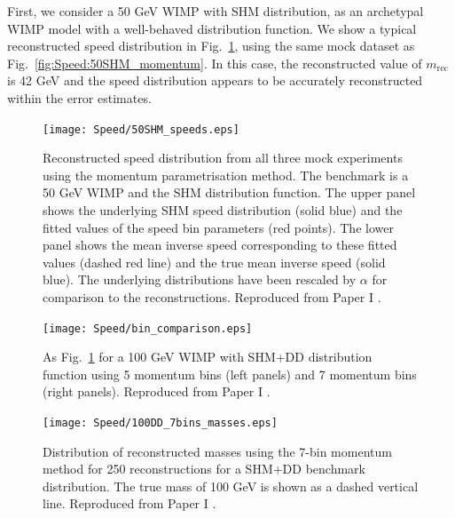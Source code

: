 First, we consider a 50 GeV WIMP with SHM distribution, as an archetypal WIMP model with a well-behaved distribution function. We show a typical reconstructed speed distribution in Fig.\ \ref{fig:Speed:SHM50}, using the same mock dataset as Fig.\ \ref{fig:Speed:50SHM_momentum}. In this case, the reconstructed value of \(m_\textrm{rec}\) is 42 GeV and the speed distribution appears to be accurately reconstructed within the error estimates.

 \begin{figure}[t]
\centering
\texttt{[image: Speed/50SHM\_speeds.eps]}
\caption[Reconstructed speed distribution from all three mock experiments using the momentum parametrisation method for a 50 GeV WIMP and SHM distribution function.]{Reconstructed speed distribution from all three mock experiments using the momentum parametrisation method. The benchmark is a 50 GeV WIMP and the SHM distribution function. The upper panel shows the underlying SHM speed distribution (solid blue) and the fitted values of the speed bin parameters (red points). The lower panel shows the mean inverse speed corresponding to these fitted values (dashed red line) and the true mean inverse speed (solid blue). The underlying distributions have been rescaled by \(\alpha\) for comparison to the reconstructions. Reproduced from Paper I \cite{Kavanagh:2012}.}
  \label{fig:Speed:SHM50}
\end{figure}

 \begin{figure}[t]
\centering
  \texttt{[image: Speed/bin\_comparison.eps]}
\caption[As Fig.\ \ref{fig:Speed:SHM50} for a 100 GeV WIMP with SHM+DD distribution function using 5 and 7 momentum bins]{As Fig.\ \ref{fig:Speed:SHM50} for a 100 GeV WIMP with SHM+DD distribution function using 5 momentum bins (left panels) and 7 momentum bins (right panels). Reproduced from Paper I \cite{Kavanagh:2012}.}
  \label{fig:Speed:DD100}
\end{figure}

\begin{figure}[t]
\centering
\texttt{[image: Speed/100DD\_7bins\_masses.eps]}
\caption[Distribution of reconstructed masses using the 7-bin momentum method for a SHM+DD benchmark distribution.]{Distribution of reconstructed masses using the 7-bin momentum method for 250 reconstructions for a SHM+DD benchmark distribution. The true mass of 100 GeV is shown as a dashed vertical line. Reproduced from Paper I \cite{Kavanagh:2012}.}
  \label{fig:Speed:7bins}
\end{figure}

